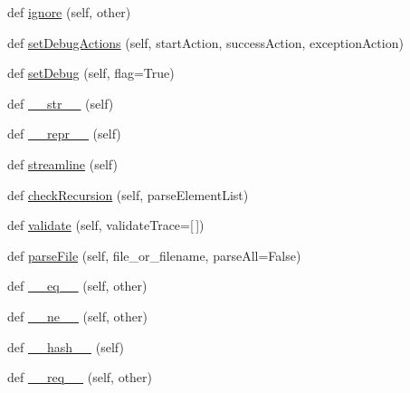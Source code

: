 \begin{DoxyCompactItemize}
\item 
def \hyperlink{classpkg__resources_1_1__vendor_1_1pyparsing_1_1ParserElement_ac2708a9557b2c3724ceb052e45ef8903}{ignore} (self, other)
\item 
def \hyperlink{classpkg__resources_1_1__vendor_1_1pyparsing_1_1ParserElement_ab5d54e826cc3f133346a2aed5f77a1dc}{set\+Debug\+Actions} (self, start\+Action, success\+Action, exception\+Action)
\item 
def \hyperlink{classpkg__resources_1_1__vendor_1_1pyparsing_1_1ParserElement_a40898433962bb7ed5fb13e32e924bd0e}{set\+Debug} (self, flag=True)
\item 
def \hyperlink{classpkg__resources_1_1__vendor_1_1pyparsing_1_1ParserElement_ac4e73fc2fe57caa6ddc496d7a7e34a3a}{\+\_\+\+\_\+str\+\_\+\+\_\+} (self)
\item 
def \hyperlink{classpkg__resources_1_1__vendor_1_1pyparsing_1_1ParserElement_a3958ca1e477f610c2f3a7f409a907961}{\+\_\+\+\_\+repr\+\_\+\+\_\+} (self)
\item 
def \hyperlink{classpkg__resources_1_1__vendor_1_1pyparsing_1_1ParserElement_adf958ac597bae4beb3a1c91a638f807f}{streamline} (self)
\item 
def \hyperlink{classpkg__resources_1_1__vendor_1_1pyparsing_1_1ParserElement_a8c96b900eab7bdbc4d996ab9b7d16069}{check\+Recursion} (self, parse\+Element\+List)
\item 
def \hyperlink{classpkg__resources_1_1__vendor_1_1pyparsing_1_1ParserElement_acef95ab1d929446bddf8dc7c5e143c43}{validate} (self, validate\+Trace=\mbox{[}$\,$\mbox{]})
\item 
def \hyperlink{classpkg__resources_1_1__vendor_1_1pyparsing_1_1ParserElement_a58920492aecac3860b5013ea35bdca1d}{parse\+File} (self, file\+\_\+or\+\_\+filename, parse\+All=False)
\item 
def \hyperlink{classpkg__resources_1_1__vendor_1_1pyparsing_1_1ParserElement_a20b56b3e2a3a8da2918a9288e55c3370}{\+\_\+\+\_\+eq\+\_\+\+\_\+} (self, other)
\item 
def \hyperlink{classpkg__resources_1_1__vendor_1_1pyparsing_1_1ParserElement_a4220b00deac3bef5d1766e2014b72881}{\+\_\+\+\_\+ne\+\_\+\+\_\+} (self, other)
\item 
def \hyperlink{classpkg__resources_1_1__vendor_1_1pyparsing_1_1ParserElement_af223861097e3eb4e809bd350e5292f0c}{\+\_\+\+\_\+hash\+\_\+\+\_\+} (self)
\item 
def \hyperlink{classpkg__resources_1_1__vendor_1_1pyparsing_1_1ParserElement_a6cd5feb55db6d0f92d81b3134ecef103}{\+\_\+\+\_\+req\+\_\+\+\_\+} (self, other)

\end{DoxyCompactItemize}
